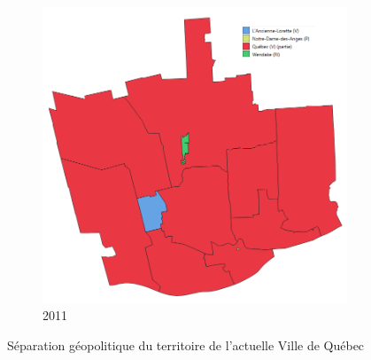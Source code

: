 \begin{figure}[ht]
\begin{subfigure}[t]{0.45\textwidth}
    \includegraphics[width=0.8 \linewidth]{images/municipalites_2011.png}
    \caption{2011}
    \label{fig:municipalites_2011}
  \end{subfigure}%
  \caption{Séparation géopolitique du territoire de l'actuelle Ville de Québec \parencite{ElectionsQuebec:AtlasHistorique:2021}}\label{fig:municipalites_carto_historique}
\end{figure}


